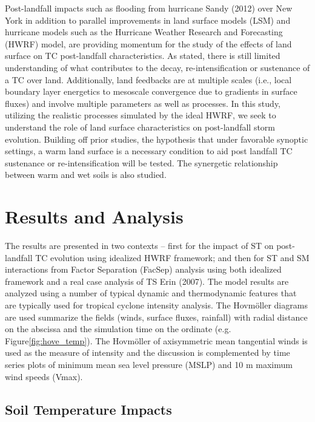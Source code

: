 \documentclass[fleqn,10pt]{wlscirep}
\begin{document}
Post-landfall impacts such as flooding from hurricane Sandy (2012) over New York in addition to parallel improvements in land surface models (LSM) and hurricane models such as the Hurricane Weather Research and Forecasting (HWRF) model, are providing momentum for the study of the effects of land surface on TC post-landfall characteristics. As stated, there is still limited understanding of what contributes to the decay, re-intensification or sustenance of a TC over land. Additionally, land feedbacks are at multiple scales (i.e., local boundary layer energetics to mesoscale convergence due to gradients in surface fluxes) and involve multiple parameters as well as processes. In this study, utilizing the realistic processes simulated by the ideal HWRF, we seek to understand the role of land surface characteristics on post-landfall storm evolution. Building off prior studies, the hypothesis that under favorable synoptic settings, a warm land surface is a necessary condition to aid post landfall TC sustenance or re-intensification will be tested. The synergetic relationship between warm and wet soils is also studied.

\section*{Results and Analysis}

The results are presented in two contexts – first for the impact of ST on post-landfall TC evolution using idealized HWRF framework; and then for ST and SM interactions from Factor Separation\cite{SteinnAlpert1993} (FacSep) analysis using both idealized framework and a real case analysis of TS Erin (2007). The model results are analyzed using a number of typical dynamic and thermodynamic features that are typically used for tropical cyclone intensity analysis\cite{Gopal2013,Halliwell2015}. The Hovmöller diagrams are used summarize the fields (winds, surface fluxes, rainfall) with radial distance on the abscissa and the simulation time on the ordinate (e.g. Figure\ref{fig:hove_temp}). The Hovmöller of axisymmetric mean tangential winds is used as the measure of intensity and the discussion is complemented by time series plots of minimum mean sea level pressure (MSLP) and 10 m maximum wind speeds (Vmax).

\subsection*{Soil Temperature Impacts}
\end{document}
